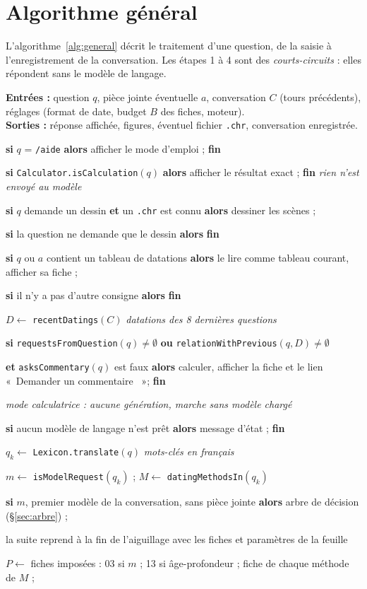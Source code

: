 \documentclass[11pt,a4paper]{article}
\providecommand{\og}{«~}\providecommand{\fg}{\unskip~»}
\newcommand{\code}[1]{\texttt{\small #1}}
\newcounter{algl}
\newlength{\algind}\setlength{\algind}{1.2em}
\newenvironment{algo}{%
  \begin{list}{\scriptsize\arabic{algl}}{\usecounter{algl}%
    \setlength{\itemsep}{0pt}\setlength{\parsep}{0pt}\setlength{\topsep}{2pt}%
    \setlength{\leftmargin}{2.2em}\setlength{\labelwidth}{1.6em}\small}}%
  {\end{list}}
\newcommand{\Li}[2]{\item\hspace*{#1\algind}#2}
\newcommand{\Kw}[1]{\textbf{#1}}
\newcommand{\Com}[1]{\hfill{\color{gray}\textit{\footnotesize #1}}}
\begin{document}
\section{Algorithme général}

L'algorithme~\ref{alg:general} décrit le traitement d'une question, de la saisie à l'enregistrement de la conversation.
Les étapes 1 à 4 sont des \emph{courts-circuits} : elles répondent sans le modèle de langage.

\begin{algorithme}[tbp]
\caption{Traitement d'une question (\code{MainWindow::sendMessage} et suite)}\label{alg:general}
\textbf{Entrées :} question $q$, pièce jointe éventuelle $a$, conversation $C$ (tours précédents), réglages
(format de date, budget $B$ des fiches, moteur).\\
\textbf{Sorties :} réponse affichée, figures, éventuel fichier \code{.chr}, conversation enregistrée.
\begin{algo}
\Li0{\Kw{si} $q$ = \code{/aide} \Kw{alors} afficher le mode d'emploi ; \Kw{fin}}
\Li0{\Kw{si} \code{Calculator.isCalculation}$(q)$ \Kw{alors} afficher le résultat exact ; \Kw{fin}
  \Com{rien n'est envoyé au modèle}}
\Li0{\Kw{si} $q$ demande un dessin \Kw{et} un \code{.chr} est connu \Kw{alors} dessiner les scènes ;}
\Li1{\Kw{si} la question ne demande que le dessin \Kw{alors} \Kw{fin}}
\Li0{\Kw{si} $q$ ou $a$ contient un tableau de datations \Kw{alors} le lire comme tableau courant, afficher sa fiche ;}
\Li1{\Kw{si} il n'y a pas d'autre consigne \Kw{alors} \Kw{fin}}
\Li0{$D \leftarrow$ \code{recentDatings}$(C)$ \Com{datations des 8 dernières questions}}
\Li0{\Kw{si} \code{requestsFromQuestion}$(q) \ne \emptyset$ \Kw{ou} \code{relationWithPrevious}$(q, D) \ne \emptyset$}
\Li1{\Kw{et} \code{asksCommentary}$(q)$ est faux \Kw{alors} calculer, afficher la fiche et le lien
  \og Demander un commentaire \fg ; \Kw{fin}}
\Li1{\Com{mode calculatrice : aucune génération, marche sans modèle chargé}}
\Li0{\Kw{si} aucun modèle de langage n'est prêt \Kw{alors} message d'état ; \Kw{fin}}
\Li0{$q_k \leftarrow$ \code{Lexicon.translate}$(q)$ \Com{mots-clés en français}}
\Li0{$m \leftarrow$ \code{isModelRequest}$(q_k)$ ; \quad $M \leftarrow$ \code{datingMethodsIn}$(q_k)$}
\Li0{\Kw{si} $m$, premier modèle de la conversation, sans pièce jointe \Kw{alors} arbre de décision
  (§\ref{sec:arbre}) ;}
\Li1{la suite reprend à la fin de l'aiguillage avec les fiches et paramètres de la feuille}
\Li0{$P \leftarrow$ fiches imposées : 03 si $m$ ; 13 si âge-profondeur ; fiche de chaque méthode de $M$ ;}

\end{algo}
\end{algorithme}
\end{document}
